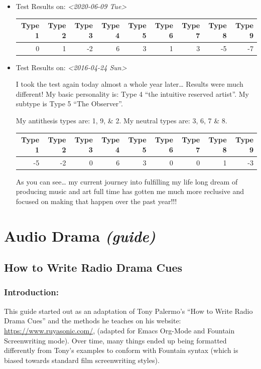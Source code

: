 \documentclass[openleft,oneside,showtrims]{memoir}
\begin{document}
\begin{itemize}
\item Test Results on: \textit{<2020-06-09 Tue>}
\label{sec:org7c3b40b}

\begin{center}
\begin{tabular}{rrrrrrrrr}
\hline
Type 1 & Type 2 & Type 3 & Type 4 & Type 5 & Type 6 & Type 7 & Type 8 & Type 9\\
\hline
0 & 1 & -2 & 6 & 3 & 1 & 3 & -5 & -7\\
\hline
\end{tabular}
\end{center}

\item Test Results on: \textit{<2016-04-24 Sun>}
\label{sec:org849f682}

I took the test again today almost a whole year later…  Results were much different!
My basic personality is: Type 4 ``the intuitive reserved artist''.  My subtype is Type 5 ``The Observer''.

My antithesis types are: 1, 9, \& 2.  My neutral types are: 3, 6, 7 \& 8.

\begin{center}
\begin{tabular}{rrrrrrrrr}
\hline
Type 1 & Type 2 & Type 3 & Type 4 & Type 5 & Type 6 & Type 7 & Type 8 & Type 9\\
\hline
-5 & -2 & 0 & 6 & 3 & 0 & 0 & 1 & -3\\
\hline
\end{tabular}
\end{center}

As you can see… my current journey into fulfilling my life long dream of producing music and art full time has gotten me much more reclusive and focused on making that happen over the past year!!!
\end{itemize}

\chapter{Audio Drama \emph{(guide)}}
\label{sec:orgd0abc48}
\section{How to Write Radio Drama Cues}
\label{sec:orgee093c2}
\subsection{Introduction:}
\label{sec:org99b4219}
This guide started out as an adaptation of Tony Palermo's ``How to Write Radio Drama Cues'' and the methods he teaches on his website: \url{https://www.ruyasonic.com/}, (adapted for Emacs Org-Mode and Fountain Screenwriting mode). Over time, many things ended up being formatted differently from Tony's examples to conform with Fountain syntax (which is biased towards standard film screenwriting styles). 
\end{document}

